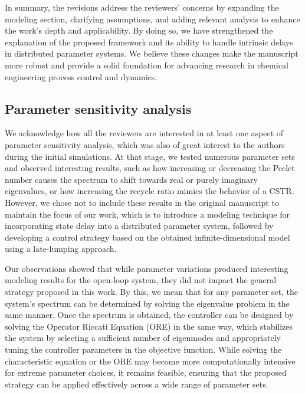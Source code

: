 \documentclass[12pt,answers]{exam}
\begin{document}
In summary, the revisions address the reviewers’ concerns by expanding the modeling section, clarifying assumptions, and adding relevant analysis to enhance the work’s depth and applicability. By doing so, we have strengthened the explanation of the proposed framework and its ability to handle intrinsic delays in distributed parameter systems. We believe these changes make the manuscript more robust and provide a solid foundation for advancing research in chemical engineering process control and dynamics.

\subsection{Parameter sensitivity analysis} \label{sec:parameter}

We acknowledge how all the reviewers are interested in at least one aspect of parameter sensitivity analysis, which was also of great interest to the authors during the initial simulations. At that stage, we tested numerous parameter sets and observed interesting results, such as how increasing or decreasing the Peclet number causes the spectrum to shift towards real or purely imaginary eigenvalues, or how increasing the recycle ratio mimics the behavior of a CSTR. However, we chose not to include these results in the original manuscript to maintain the focus of our work, which is to introduce a modeling technique for incorporating state delay into a distributed parameter system, followed by developing a control strategy based on the obtained infinite-dimensional model using a late-lumping approach.

Our observations showed that while parameter variations produced interesting modeling results for the open-loop system, they did not impact the general strategy proposed in this work. By this, we mean that for any parameter set, the system’s spectrum can be determined by solving the eigenvalue problem in the same manner. Once the spectrum is obtained, the controller can be designed by solving the Operator Riccati Equation (ORE) in the same way, which stabilizes the system by selecting a sufficient number of eigenmodes and appropriately tuning the controller parameters in the objective function. While solving the characteristic equation or the ORE may become more computationally intensive for extreme parameter choices, it remains feasible, ensuring that the proposed strategy can be applied effectively across a wide range of parameter sets.
\end{document}
